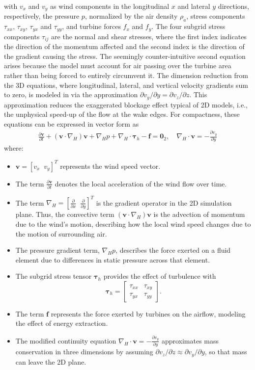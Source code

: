 with $v_x$ and $v_y$ as wind components in the longitudinal $x$ and lateral $y$ directions, respectively, the pressure $p$, normalized by the air density $\rho_a$, stress components $\tau_{xx}$, $\tau_{xy}$, $\tau_{yx}$ and $\tau_{yy}$, and turbine forces $f_x$ and $f_y$. The four subgrid stress components $\tau_{ij}$ are the normal and shear stresses, where the first index indicates the direction of the momentum affected and the second index is the direction of the gradient causing the stress. The seemingly counter-intuitive second equation arises because the model must account for air passing over the turbine area rather than being forced to entirely circumvent it. The dimension reduction from the 3D equations, where longitudinal, lateral, and vertical velocity gradients sum to zero, is modeled in \cite{boersma2018control} via the approximation $\partial v_y/\partial y = \partial v_z/\partial z$. 
This approximation reduces the exaggerated blockage effect typical of 2D models, i.e., the unphysical speed-up of the flow at the wake edges. 
%
For compactness, these equations can be expressed in vector form as
\begin{align} \label{eq:NSE2d}
    \frac{\partial \bm{v}}{\partial t}+ (\bm{v}\cdot \nabla_H)\bm{v} + \nabla_H p + \nabla_H\cdot\bm{\tau}_h  - \bm{f} = \bm{0}_{2},\quad  
    \nabla_H\cdot \bm{v} = -\frac{\partial v_y}{\partial y}
\end{align}
where:
\begin{itemize}
    \item $\bm{v} =[v_x\;\;v_y]^T$ represents the wind speed vector.
    \item The term $\frac{\partial \bm{v}}{\partial t}$ denotes the local acceleration of the wind flow over time.
    \item The term $\nabla_H = [\frac{\partial}{\partial x}\;\;\frac{\partial}{\partial y}]^T$ is the gradient operator in the 2D simulation plane. Thus, the convective term $(\bm{v}\cdot \nabla_H)\bm{v}$ is the advection of momentum due to the wind's motion, describing how the local wind speed changes due to the motion of surrounding air.
    \item The pressure gradient term, $\nabla_H p$, describes the force exerted on a fluid element due to differences in static pressure across that element.
    \item The subgrid stress tensor $\boldsymbol{\tau}_h$ provides the effect of turbulence with
    \[
    \boldsymbol{\tau}_h =
    \begin{bmatrix}
        \tau_{xx} & \tau_{xy} \\
        \tau_{yx} & \tau_{yy}
    \end{bmatrix}.
    \]
    \item The term $\bm{f}$ represents the force exerted by turbines on the airflow, modeling the effect of energy extraction.
    \item The modified continuity equation $\nabla_H\cdot \bm{v} = - \frac{\partial v_y}{\partial y}$ approximates mass conservation in three dimensions by assuming $\partial v_z/\partial z \approx \partial v_y/\partial y$, so that mass can leave the 2D plane.
\end{itemize}
